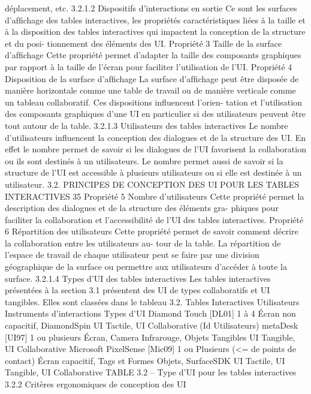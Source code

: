 \documentclass{article}
\begin{document}
déplacement, etc.
3.2.1.2
Dispositifs d’interactions en sortie
Ce sont les surfaces d’afﬁchage des tables interactives, les propriétés caractéristiques liées à la
taille et à la disposition des tables interactives qui impactent la conception de la structure et du posi-
tionnement des éléments des UI.
Propriété 3 Taille de la surface d’afﬁchage
Cette propriété permet d’adapter la taille des composants graphiques par rapport à la taille
de l’écran pour faciliter l’utilisation de l’UI.
Propriété 4 Disposition de la surface d’afﬁchage
La surface d’afﬁchage peut être disposée de manière horizontale comme une table de travail
ou de manière verticale comme un tableau collaboratif. Ces dispositions inﬂuencent l’orien-
tation et l’utilisation des composants graphiques d’une UI en particulier si des utilisateurs
peuvent être tout autour de la table.
3.2.1.3
Utilisateurs des tables interactives
Le nombre d’utilisateurs inﬂuencent la conception des dialogues et de la structure des UI. En effet
le nombre permet de savoir si les dialogues de l’UI favorisent la collaboration ou ils sont destinés
à un utilisateurs. Le nombre permet aussi de savoir si la structure de l’UI est accessible à plusieurs
utilisateurs ou si elle est destinée à un utilisateur.
3.2. PRINCIPES DE CONCEPTION DES UI POUR LES TABLES INTERACTIVES
35
Propriété 5 Nombre d’utilisateurs
Cette propriété permet la description des dialogues et de la structure des éléments gra-
phiques pour faciliter la collaboration et l’accessibilité de l’UI des tables interactives.
Propriété 6 Répartition des utilisateurs
Cette propriété permet de savoir comment décrire la collaboration entre les utilisateurs au-
tour de la table. La répartition de l’espace de travail de chaque utilisateur peut se faire par
une division géographique de la surface ou permettre aux utilisateurs d’accéder à toute la
surface.
3.2.1.4
Types d’UI des tables interactives
Les tables interactives présentées à la section 3.1 présentent des UI de types collaboratifs et UI
tangibles. Elles sont classées dans le tableau 3.2.
Tables Interactives
Utilisateurs
Instruments
d’interactions
Types d’UI
Diamond
Touch [DL01]
1 à 4
Écran non capacitif,
DiamondSpin
UI Tactile, UI
Collaborative (Id
Utilisateurs)
metaDesk [UI97]
1 ou plusieurs
Écran, Camera
Infrarouge, Objets
Tangibles
UI Tangible, UI
Collaborative
Microsoft PixelSense
[Mic09]
1 ou Plusieurs (<= de
points de contact)
Écran capacitif, Tags et
Formes Objets,
SurfaceSDK
UI Tactile, UI
Tangible, UI
Collaborative
TABLE 3.2 – Type d’UI pour les tables interactives
3.2.2
Critères ergonomiques de conception des UI
\end{document}
